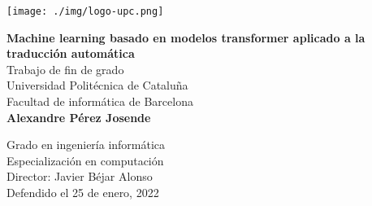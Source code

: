 \begin{titlepage}
\begin{center}

\texttt{[image: ./img/logo-upc.png]}\\[2.0cm]

\vbox{ }

{\huge \bfseries  Machine learning basado en modelos transformer aplicado a la traducción automática}\\[1.0cm]

{\Large Trabajo de fin de grado}\\[1.0cm]
{\Large Universidad Politécnica de Cataluña}\\[0.15cm]
{\large Facultad de informática de Barcelona}\\[3.0cm]

{\large \bfseries Alexandre Pérez Josende}
\vfill

{\normalsize Grado en ingeniería informática}\\
{\normalsize Especialización en computación}\\[0.4cm]

{\normalsize Director: Javier Béjar Alonso}\\[0.4cm]

{\normalsize Defendido el 25 de enero, 2022}

\end{center}
\end{titlepage}